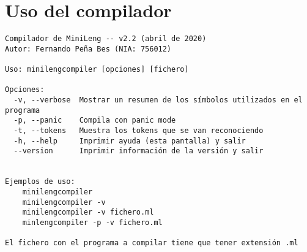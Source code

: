 \section{Uso del compilador}

\begin{verbatim}
Compilador de MiniLeng -- v2.2 (abril de 2020)
Autor: Fernando Peña Bes (NIA: 756012)

Uso: minilengcompiler [opciones] [fichero]

Opciones:
  -v, --verbose  Mostrar un resumen de los símbolos utilizados en el programa
  -p, --panic	 Compila con panic mode
  -t, --tokens   Muestra los tokens que se van reconociendo
  -h, --help	 Imprimir ayuda (esta pantalla) y salir
  --version      Imprimir información de la versión y salir


Ejemplos de uso:
    minilengcompiler
    minilengcompiler -v
    minilengcompiler -v fichero.ml
    minlengcompiler -p -v fichero.ml

El fichero con el programa a compilar tiene que tener extensión .ml
\end{verbatim}
